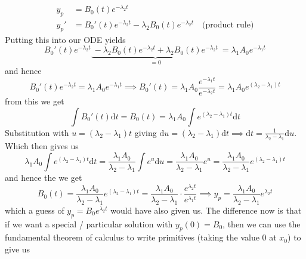 \documentclass{article}
\begin{document}
\begin{align*}
    y_{p} &= B_{0}\left(t\right)e^{-\lambda_{2}t} \\
    y_{p}' &= B_{0}'\left(t\right)e^{-\lambda_{2}t} - \lambda_{2}B_{0}\left(t\right)e^{-\lambda_{2}t} \quad \text{(product rule)}
\end{align*}
Putting this into our ODE yields
\begin{equation*}
    B_{0}'\left(t\right)e^{-\lambda_{2}t} \underbrace{\:- \lambda_{2}B_{0}\left(t\right)e^{-\lambda_{2}t} +\lambda_{2}B_{0}\left(t\right)e^{-\lambda_{2}t}\:}_{=0} =  \lambda_{1}A_{0}e^{-\lambda_{1}t} 
\end{equation*}
and hence 
\begin{equation*}
    B_{0}'\left(t\right)e^{-\lambda_{2}t} = \lambda_{1}A_{0}e^{-\lambda_{1}t} \implies B_{0}'\left(t\right) = \lambda_{1}A_{0}\frac{e^{-\lambda_{1}t}}{e^{-\lambda_{2}t}} = \lambda_{1}A_{0}e^{\left(\lambda_{2}-\lambda_{1}\right)t}
\end{equation*}
from this we get
\begin{equation*}
    \int B_{0}'\left(t\right) \mathrm{d}t = B_{0}\left(t\right) =  \lambda_{1}A_{0}\int e^{\left(\lambda_{2}-\lambda_{1}\right)t}\mathrm{d}t
\end{equation*}
Substitution with $u = \left(\lambda_{2}-\lambda_{1}\right)t$ giving $\mathrm{d}u = \left(\lambda_{2}-\lambda_{1}\right)\mathrm{d}t \implies \mathrm{d}t = \frac{1}{\lambda_{2}-\lambda_{1}}\mathrm{d}u$. Which then gives us
\begin{equation*}
    \lambda_{1}A_{0}\int e^{\left(\lambda_{2}-\lambda_{1}\right)t}\mathrm{d}t = \frac{\lambda_{1}A_{0}}{\lambda_{2}-\lambda_{1}}\int e^{u} \mathrm{d}u = \frac{\lambda_{1}A_{0}}{\lambda_{2}-\lambda_{1}} e^{u} = \frac{\lambda_{1}A_{0}}{\lambda_{2}-\lambda_{1}} e^{\left(\lambda_{2}-\lambda_{1}\right)t}
\end{equation*}
and hence the we get
\begin{equation*}
    B_{0}\left(t\right) = \frac{\lambda_{1}A_{0}}{\lambda_{2}-\lambda_{1}} e^{\left(\lambda_{2}-\lambda_{1}\right)t} = \frac{\lambda_{1}A_{0}}{\lambda_{2}-\lambda_{1}} \cdot\frac{e^{\lambda_{2}t}}{e^{\lambda_{1}t}} \implies y_{p} = \frac{\lambda_{1}A_{0}}{\lambda_{2}-\lambda_{1}} e^{\lambda_{2}t}
\end{equation*}
which a guess of $y_{p}=B_{0}e^{\lambda_{2}t}$ would have also given us. The difference now is that if we want a special / particular solution with $y_{p}\left(0\right) = B_{0}$, then we can use the fundamental theorem of calculus to write primitives (taking the value $0$ at $x_{0}$) to give us
\end{document}
